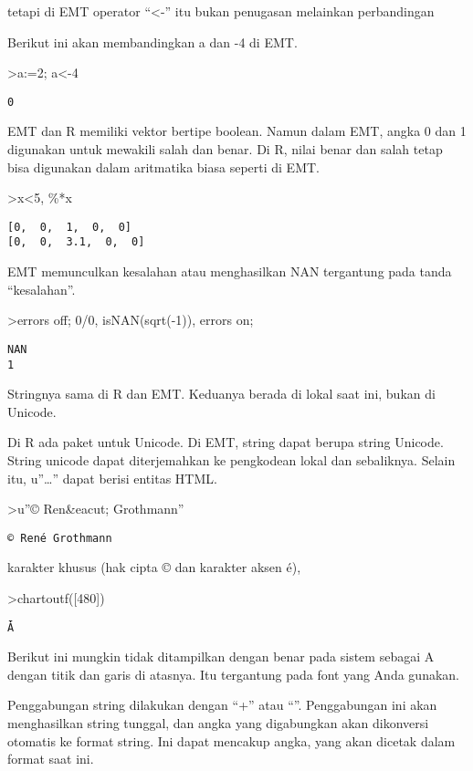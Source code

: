 \documentclass[
]{book}
\begin{document}
tetapi di EMT operator ``\textless-'' itu bukan penugasan melainkan perbandingan

Berikut ini akan membandingkan a dan -4 di EMT.

\textgreater a:=2; a\textless-4

\begin{verbatim}
0
\end{verbatim}

EMT dan R memiliki vektor bertipe boolean. Namun dalam EMT, angka 0 dan 1 digunakan untuk mewakili salah dan benar. Di R, nilai benar dan salah tetap bisa digunakan dalam aritmatika biasa seperti di EMT.

\textgreater x\textless5, \%*x

\begin{verbatim}
[0,  0,  1,  0,  0]
[0,  0,  3.1,  0,  0]
\end{verbatim}

EMT memunculkan kesalahan atau menghasilkan NAN tergantung pada tanda ``kesalahan''.

\textgreater errors off; 0/0, isNAN(sqrt(-1)), errors on;

\begin{verbatim}
NAN
1
\end{verbatim}

Stringnya sama di R dan EMT. Keduanya berada di lokal saat ini, bukan di Unicode.

Di R ada paket untuk Unicode. Di EMT, string dapat berupa string Unicode. String unicode dapat diterjemahkan ke pengkodean lokal dan sebaliknya. Selain itu, u''\ldots'' dapat berisi entitas HTML.

\textgreater u''© Ren\&eacut; Grothmann''

\begin{verbatim}
© René Grothmann
\end{verbatim}

karakter khusus (hak cipta © dan karakter aksen é),

\textgreater chartoutf({[}480{]})

\begin{verbatim}
Ǡ
\end{verbatim}

Berikut ini mungkin tidak ditampilkan dengan benar pada sistem sebagai A dengan titik dan garis di atasnya. Itu tergantung pada font yang Anda gunakan.

Penggabungan string dilakukan dengan ``+'' atau ``\textbar{}''. Penggabungan ini akan menghasilkan string tunggal, dan angka yang digabungkan akan dikonversi otomatis ke format string. Ini dapat mencakup angka, yang akan dicetak dalam format saat ini.
\end{document}
